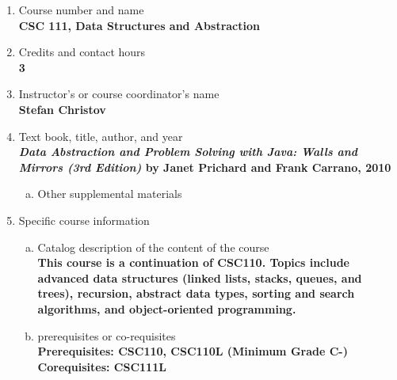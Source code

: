 \label{CSC111}  %
\begin{enumerate}[1.]
\item Course number and name\\
  {\bfseries
    CSC 111, Data Structures and Abstraction
  }
  
\item Credits and contact hours\\
  {\bfseries
    3  %
  }

\item Instructor's or course coordinator's name\\
  {\bfseries
    Stefan Christov
  }

\item Text book, title, author, and year\\
  {\bfseries
    {\em Data Abstraction and Problem Solving with Java: Walls and Mirrors (3rd Edition)} by Janet Prichard and Frank Carrano, 2010
  }
\begin{enumerate}[a.]
\item Other supplemental materials\\
  {\bfseries
    
  }
\end{enumerate}

\item Specific course information
\begin{enumerate}[a.]  
\item Catalog description of the content of the course\\
  {\bfseries
    This course is a continuation of CSC110. Topics include advanced data structures
(linked lists, stacks, queues, and trees), recursion, abstract data types,
sorting and search algorithms, and object-oriented programming.
  }

\item prerequisites or co-requisites\\
  {\bfseries
    Prerequisites: CSC110, CSC110L (Minimum Grade C-) \\  %
    Corequisites: CSC111L
  }


\end{enumerate}
\end{enumerate}
